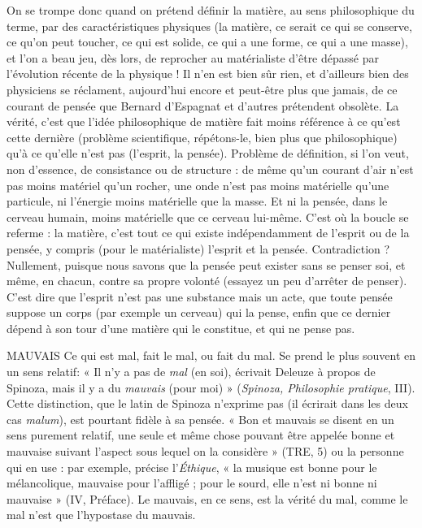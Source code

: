 On se trompe donc quand on prétend définir la matière, au sens philosophique
du terme, par des caractéristiques physiques (la matière, ce serait ce qui
se conserve, ce qu’on peut toucher, ce qui est solide, ce qui a une forme, ce qui
a une masse), et l’on a beau jeu, dès lors, de reprocher au matérialiste d’être
dépassé par l’évolution récente de la physique ! Il n’en est bien sûr rien, et
d’ailleurs bien des physiciens se réclament, aujourd’hui encore et peut-être plus
que jamais, de ce courant de pensée que Bernard d’Espagnat et d’autres prétendent
obsolète. La vérité, c’est que l’idée philosophique de matière fait moins
référence à ce qu’est cette dernière (problème scientifique, répétons-le, bien
plus que philosophique) qu’à ce qu’elle n’est pas (l'esprit, la pensée). Problème
de définition, si l’on veut, non d’essence, de consistance ou de structure : de
même qu’un courant d’air n’est pas moins matériel qu’un rocher, une onde
n’est pas moins matérielle qu’une particule, ni l’énergie moins matérielle que la
masse. Et ni la pensée, dans le cerveau humain, moins matérielle que ce cerveau
lui-même. C’est où la boucle se referme : la matière, c’est tout ce qui existe
indépendamment de l'esprit ou de la pensée, y compris (pour le matérialiste)
l'esprit et la pensée. Contradiction ? Nullement, puisque nous savons que la
pensée peut exister sans se penser soi, et même, en chacun, contre sa propre
volonté (essayez un peu d’arrêter de penser). C’est dire que l’esprit n’est pas une
substance mais un acte, que toute pensée suppose un corps (par exemple un
cerveau) qui la pense, enfin que ce dernier dépend à son tour d’une matière qui
le constitue, et qui ne pense pas.

MAUVAIS Ce qui est mal, fait le mal, ou fait du mal. Se prend le plus souvent
en un sens relatif: « Il n’y a pas de {\it mal} (en soi), écrivait
Deleuze à propos de Spinoza, mais il y a du {\it mauvais} (pour moi) » ({\it Spinoza,
Philosophie pratique}, III). Cette distinction, que le latin de Spinoza n’exprime
pas (il écrirait dans les deux cas {\it malum}), est pourtant fidèle à sa pensée. « Bon
et mauvais se disent en un sens purement relatif, une seule et même chose pouvant
être appelée bonne et mauvaise suivant l’aspect sous lequel on la
considère » (TRE, 5) ou la personne qui en use : par exemple, précise l’{\it Éthique},
« la musique est bonne pour le mélancolique, mauvaise pour l’affligé ; pour le
sourd, elle n’est ni bonne ni mauvaise » (IV, Préface). Le mauvais, en ce sens,
est la vérité du mal, comme le mal n’est que l’hypostase du mauvais.

